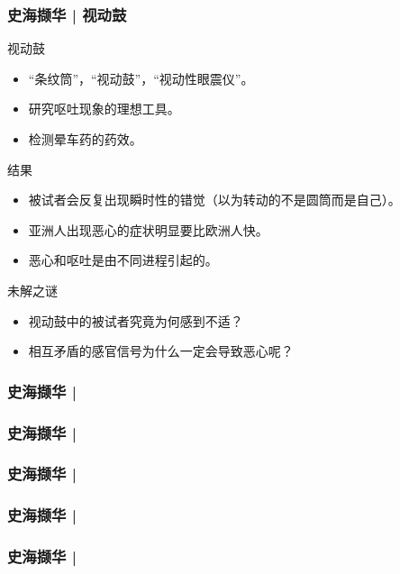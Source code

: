 \begin{frame}
  \frametitle{史海撷华 | 视动鼓}
  \begin{block}{视动鼓}
    \begin{itemize}
      \item “条纹筒”，“视动鼓”，“视动性眼震仪”。
      \item 研究呕吐现象的理想工具。
      \item 检测晕车药的药效。
    \end{itemize}
  \end{block}
  \pause
  \begin{block}{结果}
    \begin{itemize}
      \item 被试者会反复出现瞬时性的错觉（以为转动的不是圆筒而是自己）。
      \item 亚洲人出现恶心的症状明显要比欧洲人快。
      \item 恶心和呕吐是由不同进程引起的。
    \end{itemize}
  \end{block}
  \pause
  \begin{block}{未解之谜}
    \begin{itemize}
      \item 视动鼓中的被试者究竟为何感到不适？
      \item 相互矛盾的感官信号为什么一定会导致恶心呢？
    \end{itemize}
  \end{block}
\end{frame}

% 
\begin{frame}
  \frametitle{史海撷华 | }
\end{frame}

% 
\begin{frame}
  \frametitle{史海撷华 | }
\end{frame}

% 
\begin{frame}
  \frametitle{史海撷华 | }
\end{frame}

% 
\begin{frame}
  \frametitle{史海撷华 | }
\end{frame}

% 
\begin{frame}
  \frametitle{史海撷华 | }
\end{frame}

